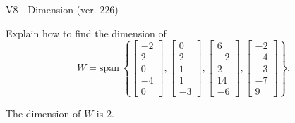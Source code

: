 \begin{exercise}
  \begin{exerciseTitle}V8 - Dimension (ver. 226)\end{exerciseTitle}
  \begin{exerciseStatement}
    Explain how to find the dimension of 
\[W=\mathrm{span}\ \left\{\left[\begin{array}{r}
-2 \\
2 \\
0 \\
-4 \\
0
\end{array}\right] , \left[\begin{array}{r}
0 \\
2 \\
1 \\
1 \\
-3
\end{array}\right] , \left[\begin{array}{r}
6 \\
-2 \\
2 \\
14 \\
-6
\end{array}\right] , \left[\begin{array}{r}
-2 \\
-4 \\
-3 \\
-7 \\
9
\end{array}\right]\right\}.\]



  \end{exerciseStatement}
  \begin{exerciseAnswer}
   The dimension of \(W\) is  \(2\).
  


  \end{exerciseAnswer}
\end{exercise}